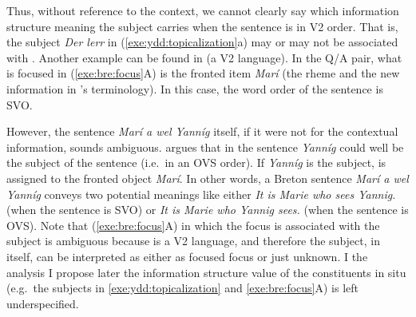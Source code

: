 \noindent Thus, without reference to the context, we cannot clearly
say which information structure meaning the subject carries when the
sentence is in V2 order. That is, the subject \textit{Der
  ler{\textschwa}r} in (\ref{exe:ydd:topicalization}a) may or may not
be associated with .  Another example can be found in
 (a V2 language). In the Q/A pair, what
is focused in (\ref{exe:bre:focus}A) is the fronted item
\textit{Mar\'i} (the rheme and the new information in
\citeauthor{press:86}'s terminology). In this case, the word order of the
sentence is SVO.


\noindent However, the sentence \textit{Mar\'i a wel Yann\'ig} itself,
if it were not for the contextual information, sounds
ambiguous. \citeauthor{press:86} argues that in the sentence
\textit{Yann\'ig} could well be the subject of the sentence (i.e.\ in
an OVS order). If \textit{Yann\'ig} is the subject,  is
assigned to the fronted object \textit{Mar\'i}. In other words, a
Breton sentence \textit{Mar\'i a wel Yann\'ig} conveys two potential
meanings like either \textit{It is Marie who sees Yannig.} (when the
sentence is SVO) or \textit{It is Marie who Yannig sees.} (when the
sentence is OVS).  Note that (\ref{exe:bre:focus}A) in which the focus
is associated with the subject is ambiguous because  is a
V2 language, and therefore the subject, in itself,
can be interpreted as either as focused focus or just unknown. I the
analysis I propose later the information structure value of the
constituents in situ (e.g.\ the subjects in
\ref{exe:ydd:topicalization} and \ref{exe:bre:focus}A) is left
underspecified.


